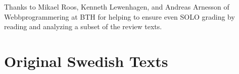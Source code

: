 \documentclass[twoside,twocolumn,a4paper,11pt,english]{article}
\begin{document}
Thanks to Mikael Roos, Kenneth Lewenhagen, and Andreas Arnesson of Webbprogrammering at BTH for helping to ensure even SOLO grading by reading and analyzing a subset of the review texts.







\newpage

\appendix

\section{Original Swedish Texts} \label{app:original}
\end{document}
